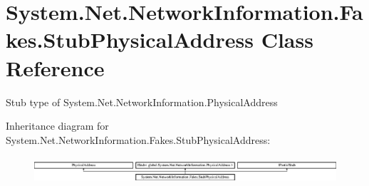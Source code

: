 \hypertarget{class_system_1_1_net_1_1_network_information_1_1_fakes_1_1_stub_physical_address}{\section{System.\-Net.\-Network\-Information.\-Fakes.\-Stub\-Physical\-Address Class Reference}
\label{class_system_1_1_net_1_1_network_information_1_1_fakes_1_1_stub_physical_address}
}


Stub type of System.\-Net.\-Network\-Information.\-Physical\-Address 


Inheritance diagram for System.\-Net.\-Network\-Information.\-Fakes.\-Stub\-Physical\-Address\-:\begin{figure}[H]
\begin{center}
\leavevmode
\includegraphics[height=0.972222cm]{class_system_1_1_net_1_1_network_information_1_1_fakes_1_1_stub_physical_address}
\end{center}
\end{figure}
